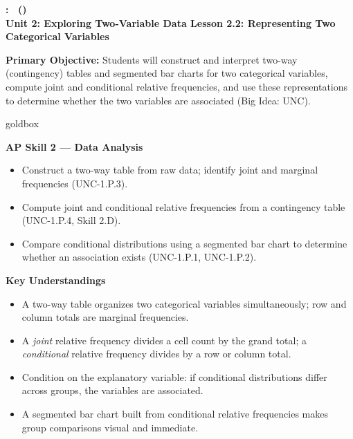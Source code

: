 \documentclass[10pt]{article}
\newcommand{\UnitNumberName}{Unit 2: Exploring Two-Variable Data \quad}
\newcommand{\LessonNumberName}{Lesson 2.2: Representing Two Categorical Variables}
\begin{document}
\begin{center}
    {\Large\bfseries \CourseName: \SchoolYear\ (\MeetingLength) \\
    {\small\bfseries \UnitNumberName \LessonNumberName}}
\end{center}

\begin{tcolorbox}[colback=sky, colframe=navy, boxrule=0.9pt, arc=2mm,
    left=2mm, right=2mm, top=1.5mm, bottom=1.5mm]
    \textbf{Primary Objective:} Students will construct and interpret two-way (contingency)
    tables and segmented bar charts for two categorical variables, compute joint and
    conditional relative frequencies, and use these representations to determine whether
    the two variables are associated (Big Idea: UNC).
\end{tcolorbox}

\renewcommand{\arraystretch}{1.6}
\begin{skillbox}{goldbox}
\begin{minipage}[t]{0.48\linewidth}
    \textbf{AP Skill 2 --- Data Analysis}
    \begin{itemize}
        \item Construct a two-way table from raw data; identify joint and marginal
              frequencies (UNC-1.P.3).
        \item Compute joint and conditional relative frequencies from a contingency
              table (UNC-1.P.4, Skill 2.D).
        \item Compare conditional distributions using a segmented bar chart to
              determine whether an association exists (UNC-1.P.1, UNC-1.P.2).
    \end{itemize}
\end{minipage}
\hfill
\begin{minipage}[t]{0.48\linewidth}
    \textbf{Key Understandings}
    \begin{itemize}
        \item A two-way table organizes two categorical variables simultaneously;
              row and column totals are marginal frequencies.
        \item A \emph{joint} relative frequency divides a cell count by the grand
              total; a \emph{conditional} relative frequency divides by a row or
              column total.
        \item Condition on the explanatory variable: if conditional distributions
              differ across groups, the variables are associated.
        \item A segmented bar chart built from conditional relative frequencies
              makes group comparisons visual and immediate.
    \end{itemize}
\end{minipage}
\end{skillbox}
\end{document}
